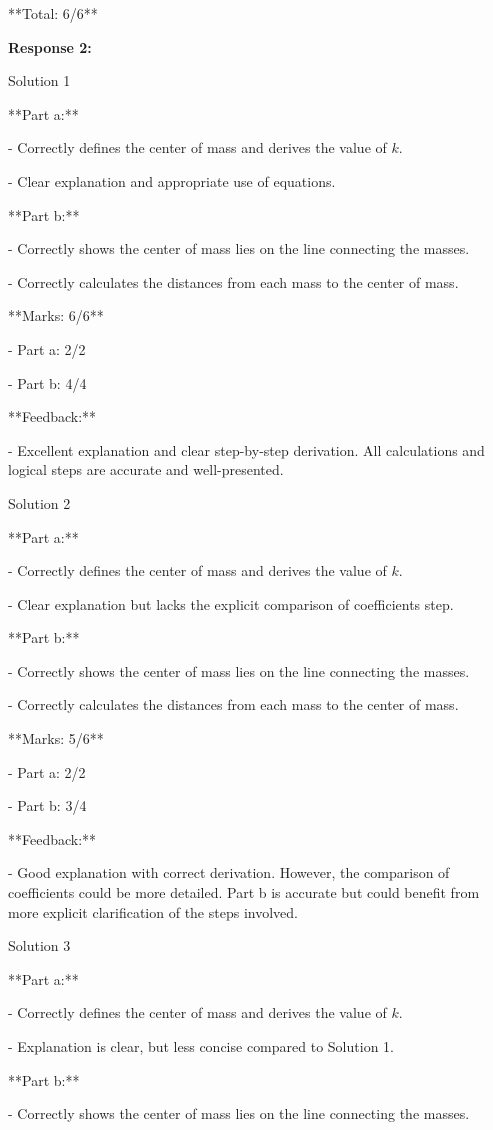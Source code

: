 \documentclass[a4paper,11pt]{article}
\begin{document}
**Total: 6/6**

\bigskip
\textbf{Response 2:}

Solution 1

**Part a:**

- Correctly defines the center of mass and derives the value of \( k \).

- Clear explanation and appropriate use of equations.

**Part b:**

- Correctly shows the center of mass lies on the line connecting the masses.

- Correctly calculates the distances from each mass to the center of mass.

**Marks: 6/6**

- Part a: 2/2

- Part b: 4/4

**Feedback:**

- Excellent explanation and clear step-by-step derivation. All calculations and logical steps are accurate and well-presented.

Solution 2

**Part a:**

- Correctly defines the center of mass and derives the value of \( k \).

- Clear explanation but lacks the explicit comparison of coefficients step.

**Part b:**

- Correctly shows the center of mass lies on the line connecting the masses.

- Correctly calculates the distances from each mass to the center of mass.

**Marks: 5/6**

- Part a: 2/2

- Part b: 3/4

**Feedback:**

- Good explanation with correct derivation. However, the comparison of coefficients could be more detailed. Part b is accurate but could benefit from more explicit clarification of the steps involved.

Solution 3

**Part a:**

- Correctly defines the center of mass and derives the value of \( k \).

- Explanation is clear, but less concise compared to Solution 1.

**Part b:**

- Correctly shows the center of mass lies on the line connecting the masses.
\end{document}
